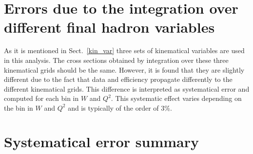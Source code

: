 \section{Errors due to the integration over different final hadron variables}
\label{integr}

As it is mentioned in Sect.~\ref{kin_var} three sets of kinematical variables are used in this analysis. The cross sections obtained by integration over these three kinematical grids should be the same. However, it is found that they are slightly different due to the fact that data and efficiency propagate differently to the different kinematical grids. This difference is interpreted as systematical error and computed for each bin in $W$ and $Q^{2}$. This systematic effect varies depending on the bin in $W$ and $Q^{2}$ and is typically of the order of 3\%.




\section{Systematical error summary}
\label{syssummary}

